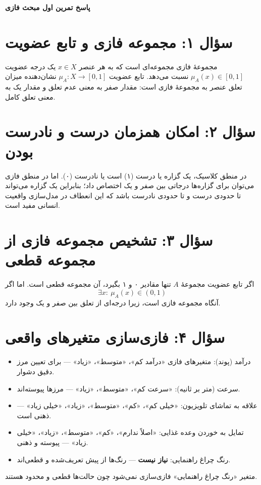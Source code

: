 \documentclass[12pt,a4paper]{article}
\begin{document}
	\begin{center}
		{\LARGE\textbf{پاسخ تمرین اول مبحث فازی}}\\[0.5em]
	\end{center}
	
	\section*{سؤال ۱: مجموعه فازی و تابع عضویت}
	مجموعهٔ فازی  مجموعه‌ای است که به هر عنصر \(x\in X\) یک درجه عضویت \(\mu_A(x)\in[0,1]\) نسبت می‌دهد. تابع عضویت \(\mu_A: X\to[0,1]\) نشان‌دهنده میزان تعلق عنصر به مجموعهٔ فازی است: مقدار صفر به معنی عدم تعلق و مقدار یک به معنی تعلق کامل.
	
	\section*{سؤال ۲: امکان همزمان درست و نادرست بودن}
	در منطق کلاسیک، یک گزاره یا درست (۱) است یا نادرست (۰). اما در منطق فازی می‌توان برای گزاره‌ها درجاتی بین صفر و یک اختصاص داد؛ بنابراین یک گزاره می‌تواند تا حدودی درست و تا حدودی نادرست باشد که این انعطاف در مدل‌سازی واقعیت انسانی مفید است.
	
	\section*{سؤال ۳: تشخیص مجموعه فازی از مجموعه قطعی}
	اگر تابع عضویت مجموعهٔ \(A\) تنها مقادیر ۰ و ۱ بگیرد، آن مجموعه قطعی است. اما اگر
	\[
	\exists x:\ \mu_A(x)\in(0,1)
	\]
	آنگاه مجموعه فازی است، زیرا درجه‌ای از تعلق بین صفر و یک وجود دارد.
	
	\section*{سؤال ۴: فازی‌سازی متغیرهای واقعی}
	\begin{itemize}
		\item درآمد (پوند): متغیرهای فازی «درآمد کم»، «متوسط»، «زیاد» — برای تعیین مرز دقیق دشوار.
		\item سرعت (متر بر ثانیه): «سرعت کم»، «متوسط»، «زیاد» — مرزها پیوسته‌اند.
		\item علاقه به تماشای تلویزیون: «خیلی کم»، «کم»، «متوسط»، «زیاد»، «خیلی زیاد» — ذهنی است.
		\item تمایل به خوردن وعده غذایی: «اصلاً ندارم»، «کم»، «متوسط»، «زیاد»، «خیلی زیاد» — پیوسته و ذهنی.
		\item رنگ چراغ راهنمایی: \textbf{نیاز نیست} — رنگ‌ها از پیش تعریف‌شده و قطعی‌اند.
	\end{itemize}
	متغیر «رنگ چراغ راهنمایی» فازی‌سازی نمی‌شود چون حالت‌ها قطعی و محدود هستند.
	
\end{document}
